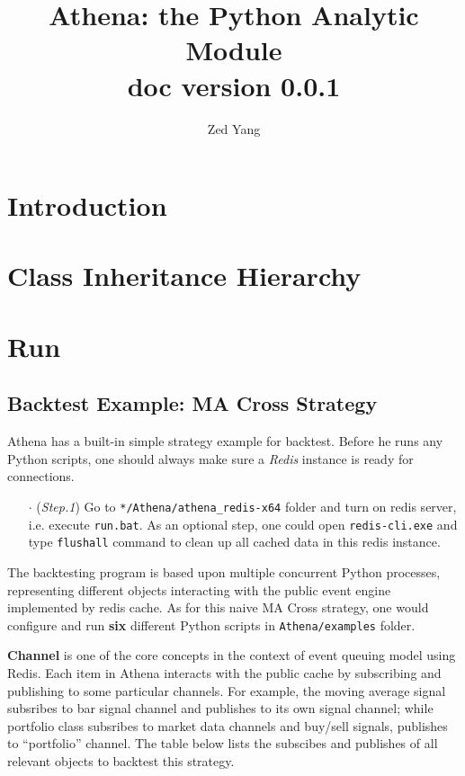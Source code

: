 \documentclass[a4paper, 11pt]{article}
\title{\textbf{Athena: the Python Analytic Module} \\ doc version 0.0.1}
\author{Zed Yang}
\begin{document}
\maketitle

\section{Introduction}
\section{Class Inheritance Hierarchy}
\section{Run}
\subsection{Backtest Example: MA Cross Strategy}
Athena has a built-in simple strategy example for backtest. Before he runs any Python scripts, one should always make sure a \textit{Redis} instance is ready for connections.

\begin{itemize}
	\item[$\cdot$] (\textit{Step.1}) Go to \texttt{*/Athena/athena\_redis-x64} folder and turn on redis server, i.e. execute \texttt{run.bat}. As an optional step, one could open \texttt{redis-cli.exe} and type \texttt{flushall} command to clean up all cached data in this redis instance.
\end{itemize}

The backtesting program is based upon multiple concurrent Python processes, representing different objects interacting with the public event engine implemented by redis cache. As for this naive MA Cross strategy, one would configure and run \textbf{six} different Python scripts in \texttt{Athena/examples} folder.

\textbf{Channel} is one of the core concepts in the context of event queuing model using Redis. Each item in Athena interacts with the public cache by subscribing and publishing to some particular channels. For example, the moving average signal subsribes to bar signal channel and publishes to its own signal channel; while portfolio class subsribes to market data channels and buy/sell signals, publishes to ``portfolio'' channel. The table below lists the subscibes and publishes of all relevant objects to backtest this strategy.
\end{document}
